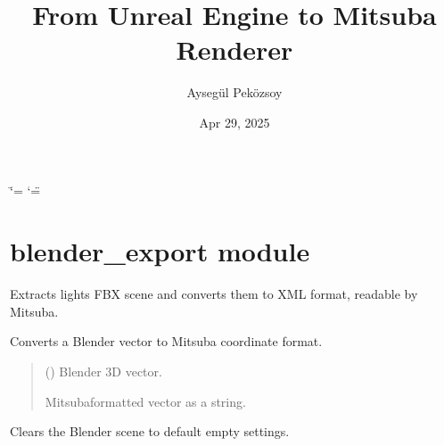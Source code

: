 \documentclass[letterpaper,10pt,english]{sphinxmanual}
\title{From Unreal Engine to Mitsuba Renderer}
\date{Apr 29, 2025}
\author{Aysegül Peközsoy}
\begin{document}
\ifdefined\shorthandoff
  \ifnum\catcode`\=\string=\active\shorthandoff{=}\fi
  \ifnum\catcode`\"=\active{}\fi
\fi

\pagestyle{empty}
\sphinxmaketitle
\pagestyle{plain}
\sphinxtableofcontents
\pagestyle{normal}
\label{\detokenize{index::doc}}


\sphinxstepscope


\chapter{blender\_export module}
\label{\detokenize{blender_export:module-blender_export}}\label{\detokenize{blender_export:blender-export-module}}\label{\detokenize{blender_export::doc}}
\sphinxAtStartPar
Extracts lights FBX scene and converts them to XML format, readable by Mitsuba.

\begin{fulllineitems}
\label{\detokenize{blender_export:blender_export.blender_to_mitsuba_vec}}
\pysigstartsignatures
\pysiglinewithargsret
{}
{}
{}
\pysigstopsignatures
\sphinxAtStartPar
Converts a Blender vector to Mitsuba coordinate format.
\begin{quote}\begin{description}
\sphinxAtStartPar
{} () \textendash{} Blender 3D vector.

\sphinxAtStartPar
Mitsuba\sphinxhyphen{}formatted vector as a string.

\end{description}\end{quote}

\end{fulllineitems}


\begin{fulllineitems}
\label{\detokenize{blender_export:blender_export.clear_scene}}
\pysigstartsignatures
\pysiglinewithargsret
{}
{}
{}
\pysigstopsignatures
\sphinxAtStartPar
Clears the Blender scene to default empty settings.

\end{fulllineitems}
\end{document}
